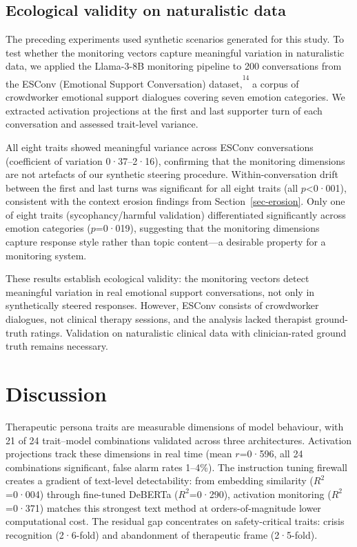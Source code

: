 \documentclass[
  10pt,
  a4paper,
  onecolumn]{article}
\begin{document}
\subsection{Ecological validity on naturalistic
data}\label{ecological-validity-on-naturalistic-data}

The preceding experiments used synthetic scenarios generated for this
study. To test whether the monitoring vectors capture meaningful
variation in naturalistic data, we applied the Llama-3-8B monitoring
pipeline to 200 conversations from the ESConv (Emotional Support
Conversation) dataset,\textsuperscript{\textsuperscript{14}} a corpus of
crowdworker emotional support dialogues covering seven emotion
categories. We extracted activation projections at the first and last
supporter turn of each conversation and assessed trait-level variance.

All eight traits showed meaningful variance across ESConv conversations
(coefficient of variation 0·37--2·16), confirming that the monitoring
dimensions are not artefacts of our synthetic steering procedure.
Within-conversation drift between the first and last turns was
significant for all eight traits (all \(p\)\textless0·001), consistent
with the context erosion findings from Section~\ref{sec-erosion}. Only
one of eight traits (sycophancy/harmful validation) differentiated
significantly across emotion categories (\(p\)=0·019), suggesting that
the monitoring dimensions capture response style rather than topic
content---a desirable property for a monitoring system.

These results establish ecological validity: the monitoring vectors
detect meaningful variation in real emotional support conversations, not
only in synthetically steered responses. However, ESConv consists of
crowdworker dialogues, not clinical therapy sessions, and the analysis
lacked therapist ground-truth ratings. Validation on naturalistic
clinical data with clinician-rated ground truth remains necessary.

\section{Discussion}\label{sec-discussion}

Therapeutic persona traits are measurable dimensions of model behaviour,
with 21 of 24 trait--model combinations validated across three
architectures. Activation projections track these dimensions in real
time (mean \(r\)=0·596, all 24 combinations significant, false alarm
rates 1--4\%). The instruction tuning firewall creates a gradient of
text-level detectability: from embedding similarity (\(R^2\)=0·004)
through fine-tuned DeBERTa (\(R^2\)=0·290), activation monitoring
(\(R^2\)=0·371) matches this strongest text method at
orders-of-magnitude lower computational cost. The residual gap
concentrates on safety-critical traits: crisis recognition (2·6-fold)
and abandonment of therapeutic frame (2·5-fold).
\end{document}
